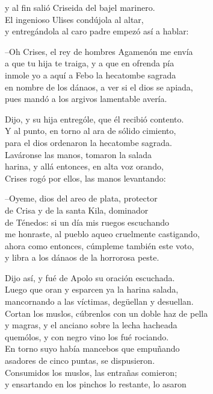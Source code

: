 y al fin salió Criseida del bajel marinero.\\
El ingenioso Ulises condújola al altar,\\
y entregándola al caro padre empezó así a hablar:\par
--Oh Crises, el rey de hombres Agamenón me envía\\
a que tu hija te traiga, y a que en ofrenda pía\\
inmole yo a aquí a Febo la hecatombe sagrada\\
en nombre de los dánaos, a ver si el dios se apiada,\\
pues mandó a los argivos lamentable avería.\par
Dijo, y su hija entrególe, que él recibió contento.\\
Y al punto, en torno al ara de sólido cimiento,\\
para el dios ordenaron la hecatombe sagrada.\\
Laváronse las manos, tomaron la salada\\
harina, y allá entonces, en alta voz orando,\\
Crises rogó por ellos, las manos levantando:\par
--Oyeme, dios del areo de plata, protector\\
de Crisa y de la santa Kila, dominador\\
de Ténedos: si un día mis ruegos escuchando\\
me honraste, al pueblo aqueo cruelmente castigando,\\
ahora como entonces, cúmpleme también este voto,\\
y libra a los dánaos de la horrorosa peste.\par
Dijo así, y fué de Apolo su oración escuchada.\\
Luego que oran y esparcen ya la harina salada,\\
mancornando a las víctimas, degüellan y desuellan.\\
Cortan los muslos, cúbrenlos con un doble haz de pella\\
y magras, y el anciano sobre la lecha hacheada\\
quemólos, y con negro vino los fué rociando.\\
En torno suyo había mancebos que empuñando\\
asadores de cinco puntas, se dispusieron.\\
Consumidos los muslos, las entrañas comieron;\\
y ensartando en los pinchos lo restante, lo asaron\\
